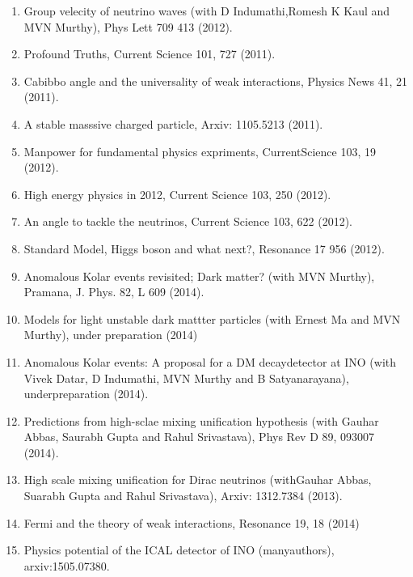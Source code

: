 \begin{enumerate}
\item Group velecity of neutrino waves (with D Indumathi,\break Romesh K Kaul and MVN Murthy), Phys Lett 709 413 (2012).

\item Profound Truths, Current Science 101, 727 (2011).

\item Cabibbo angle and the universality of weak interactions, Physics News 41, 21 (2011).

\item A stable masssive charged particle, Arxiv: 1105.5213 (2011).

\item Manpower for fundamental physics expriments, Current\break Science 103, 19 (2012).

\item High energy physics in 2012, Current Science 103, 250 (2012).

\item An angle to tackle the neutrinos, Current Science 103, 622 (2012).

\item Standard Model, Higgs boson and what next?, Resonance 17 956 (2012).

\item Anomalous Kolar events revisited; Dark matter? (with MVN Murthy), Pramana, J. Phys. 82, L 609 (2014).

\item Models for light unstable dark mattter particles (with Ernest Ma and MVN Murthy), under preparation (2014)

\item Anomalous Kolar events: A proposal for a DM decay\break detector at INO (with Vivek Datar, D Indumathi, MVN Murthy and B Satyanarayana), underpreparation (2014).

\item Predictions from high-sclae mixing unification hypothesis (with Gauhar Abbas, Saurabh Gupta and Rahul Srivastava), Phys Rev D 89, 093007 (2014).

\item High scale mixing unification for Dirac neutrinos (with\break Gauhar Abbas, Suarabh Gupta and Rahul Srivastava), Arxiv: 1312.7384 (2013).

\item Fermi and the theory of weak interactions, Resonance 19, 18 (2014)

\item Physics potential of the ICAL detector of INO (many\break authors), arxiv:1505.07380.


\end{enumerate}

